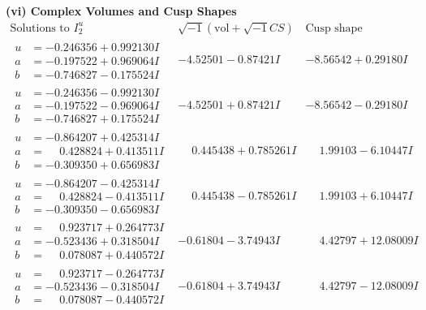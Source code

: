 \documentclass[1p]{elsarticle_modified}
\theoremstyle{definition}
\newcommand{\I}{\sqrt{-1}}
\begin{document}
\newpage\flushleft \textbf{(vi) Complex Volumes and Cusp Shapes}
$$\begin{array}{c|c|c}  
\text{Solutions to }I^u_{2}& \I (\text{vol} + \sqrt{-1}CS) & \text{Cusp shape}\\
 \hline 
\begin{aligned}
u &= -0.246356 + 0.992130 I \\
a &= -0.197522 + 0.969064 I \\
b &= -0.746827 - 0.175524 I\end{aligned}
 & -4.52501 - 0.87421 I & -8.56542 + 0.29180 I \\ \hline\begin{aligned}
u &= -0.246356 - 0.992130 I \\
a &= -0.197522 - 0.969064 I \\
b &= -0.746827 + 0.175524 I\end{aligned}
 & -4.52501 + 0.87421 I & -8.56542 - 0.29180 I \\ \hline\begin{aligned}
u &= -0.864207 + 0.425314 I \\
a &= \phantom{-}0.428824 + 0.413511 I \\
b &= -0.309350 + 0.656983 I\end{aligned}
 & \phantom{-}0.445438 + 0.785261 I & \phantom{-}1.99103 - 6.10447 I \\ \hline\begin{aligned}
u &= -0.864207 - 0.425314 I \\
a &= \phantom{-}0.428824 - 0.413511 I \\
b &= -0.309350 - 0.656983 I\end{aligned}
 & \phantom{-}0.445438 - 0.785261 I & \phantom{-}1.99103 + 6.10447 I \\ \hline\begin{aligned}
u &= \phantom{-}0.923717 + 0.264773 I \\
a &= -0.523436 + 0.318504 I \\
b &= \phantom{-}0.078087 + 0.440572 I\end{aligned}
 & -0.61804 - 3.74943 I & \phantom{-}4.42797 + 12.08009 I \\ \hline\begin{aligned}
u &= \phantom{-}0.923717 - 0.264773 I \\
a &= -0.523436 - 0.318504 I \\
b &= \phantom{-}0.078087 - 0.440572 I\end{aligned}
 & -0.61804 + 3.74943 I & \phantom{-}4.42797 - 12.08009 I \\ \hline\begin{aligned}

\end{aligned}
\end{array}$$
\end{document}
